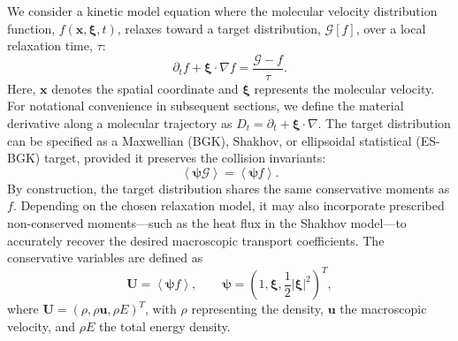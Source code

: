 \documentclass[preprint,12pt]{elsarticle}
\begin{document}
We consider a kinetic model equation where the molecular velocity distribution function, \(f(\boldsymbol{x},\boldsymbol{\xi},t)\), relaxes toward a target distribution, \(\mathcal{G}[f]\), over a local relaxation time, \(\tau\):
\begin{equation}\label{eq:kinetic_relaxation}
    \partial_t f + \boldsymbol{\xi} \cdot \nabla f = \frac{\mathcal{G}-f}{\tau}.
\end{equation}
Here, \(\boldsymbol{x}\) denotes the spatial coordinate and \(\boldsymbol{\xi}\) represents the molecular velocity. For notational convenience in subsequent sections, we define the material derivative along a molecular trajectory as \(D_t = \partial_t + \boldsymbol{\xi} \cdot \nabla\). The target distribution can be specified as a Maxwellian (BGK), Shakhov, or ellipsoidal statistical (ES-BGK) target, provided it preserves the collision invariants:
\begin{equation}\label{eq:target_conservation_general}
    \left\langle \boldsymbol{\psi}\mathcal{G} \right\rangle = \left\langle \boldsymbol{\psi}f \right\rangle.
\end{equation}
By construction, the target distribution shares the same conservative moments as \(f\). Depending on the chosen relaxation model, it may also incorporate prescribed non-conserved moments---such as the heat flux in the Shakhov model---to accurately recover the desired macroscopic transport coefficients. The conservative variables are defined as
\begin{equation}
    \mathbf{U} = \left\langle \boldsymbol{\psi}f \right\rangle,\qquad
    \boldsymbol{\psi} = \left(1, \boldsymbol{\xi}, \frac{1}{2}|\boldsymbol{\xi}|^2\right)^T,
\end{equation}
where \(\mathbf{U} = (\rho, \rho\boldsymbol{u}, \rho E)^T\), with \(\rho\) representing the density, \(\boldsymbol{u}\) the macroscopic velocity, and \(\rho E\) the total energy density.
\end{document}
